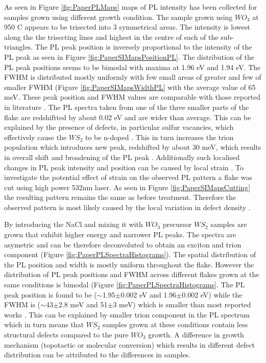 \documentclass[12pt]{article}
\begin{document}
As seen in Figure \ref{fig:PaperPLMaps} maps of PL intensity has been collected for samples grown using different growth condition. The sample grown using $WO_3$ at 950 {\degree}C appears to be trisected into 3 symmetrical areas. The intensity is lowest along the the trisecting lines and highest in the centre of each of the sub-triangles. The PL peak position is inversely proportional to the intensity of the PL peak as seen in Figure \ref{fig:PaperSIMapsPositionPL}. The distribution of the PL peak positions seems to be bimodal with maxima at 1.96 eV and 1.94 eV. The FWHM is distributed mostly uniformly with few small areas of greater and few of smaller FWHM (Figure \ref{fig:PaperSIMapsWidthPL} with the average value of 65 meV. These peak position and FWHM values are comparable with those reported in literature \cite{ExtraordinaryRoomTemperaturePhotoluminescenceInTriangularWS2Monolayers}\cite{Rong2014}\cite{Hu2016}\cite{Kang2015a}. The PL spectra taken from one of the three smaller parts of the flake are redshiftted by about 0.02 eV and are wider than average. This can be explained by the presence of defects, in particular sulfur vacancies, which effectively cause the $WS_2$ to be n-doped \cite{Hui2013}\cite{Peimyoo2014}. This in turn increases the trion population which introduces new peak, redshifted by about 30 meV, which results in overall shift and broadening of the PL peak \cite{Tongay2013}\cite{ExtraordinaryRoomTemperaturePhotoluminescenceInTriangularWS2Monolayers}. Additionally such localised changes in PL peak intensity and position can be caused by local strain \cite{Liu2014}\cite{Hui2013}. To investigate the potential effect of strain on the observed PL pattern a flake was cut using high power 532nm laser. As seen in Figure \ref{fig:PaperSIMapsCutting} the resulting pattern remains the same as before treatment. Therefore the observed pattern is most likely caused by the local variation in defect density \cite{Liu2016}.

By introducing the NaCl and mixing it with $WO_3$ precursor $WS_2$ samples are grown that exhibit higher energy and narrower PL peaks. The spectra are asymetric and can be therefore deconvoluted to obtain an exciton and trion component (Figure \ref{fig:PaperPLSpectraHistograms}). The spatial distribution of the PL position and width is mostly uniform throughout the flake. However the distribution of PL peak positions and FWHM across different flakes grown at the same conditions is bimodal (Figure \ref{fig:PaperPLSpectraHistograms}. The PL peak position is found to be ({$\sim$}1.95{$\pm$}0.002 eV and 1.96{$\pm$}0.002 eV) while the FWHM is ({$\sim$}43{$\pm$}2.8 meV and 51{$\pm$}3 meV) which is smaller than most reported works \cite{ExtraordinaryRoomTemperaturePhotoluminescenceInTriangularWS2Monolayers}\cite{Rong2014}\cite{Hu2016}\cite{Kang2015a}. This can be explained by smaller trion component in the PL spectrum which in turn means that $WS_2$ samples grown at these conditions contain less structural defects compared to the pure $WO_3$ growth. A difference in growth mechanism (topotactic or molecular conversion) which results in different defect distribution can be attributed to the differences in samples.
\end{document}
